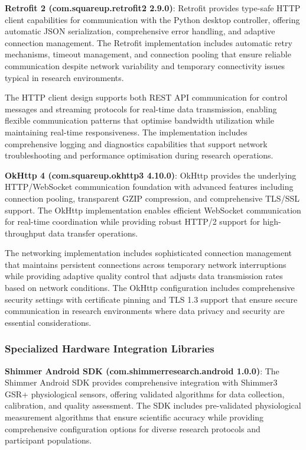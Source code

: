 \documentclass[11pt,a4paper]{report}
\begin{document}
\noindent \textbf{Retrofit 2 (com.squareup.retrofit2 2.9.0)}: Retrofit provides type-safe HTTP client capabilities for communication with the Python desktop controller, offering automatic JSON serialization, comprehensive error handling, and adaptive connection management. The Retrofit implementation includes automatic retry mechanisms, timeout management, and connection pooling that ensure reliable communication despite network variability and temporary connectivity issues typical in research environments.

The HTTP client design supports both REST API communication for control messages and streaming protocols for real-time data transmission, enabling flexible communication patterns that optimise bandwidth utilization while maintaining real-time responsiveness. The implementation includes comprehensive logging and diagnostics capabilities that support network troubleshooting and performance optimisation during research operations.

\noindent \textbf{OkHttp 4 (com.squareup.okhttp3 4.10.0)}: OkHttp provides the underlying HTTP/WebSocket communication foundation with advanced features including connection pooling, transparent GZIP compression, and comprehensive TLS/SSL support. The OkHttp implementation enables efficient WebSocket communication for real-time coordination while providing robust HTTP/2 support for high-throughput data transfer operations.

The networking implementation includes sophisticated connection management that maintains persistent connections across temporary network interruptions while providing adaptive quality control that adjusts data transmission rates based on network conditions. The OkHttp configuration includes comprehensive security settings with certificate pinning and TLS 1.3 support that ensure secure communication in research environments where data privacy and security are essential considerations.

\subsubsection{Specialized Hardware Integration Libraries}

\noindent \textbf{Shimmer Android SDK (com.shimmerresearch.android 1.0.0)}: The Shimmer Android SDK provides comprehensive integration with Shimmer3 GSR+ physiological sensors, offering validated algorithms for data collection, calibration, and quality assessment. The SDK includes pre-validated physiological measurement algorithms that ensure scientific accuracy while providing comprehensive configuration options for diverse research protocols and participant populations.
\end{document}
